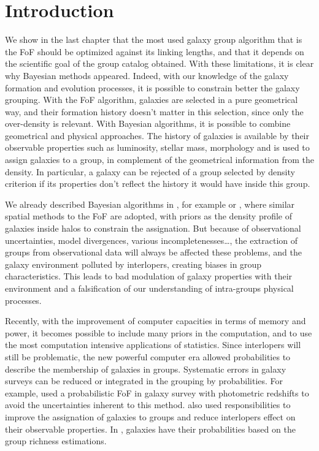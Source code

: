 \section{Introduction}
\label{sec:maggie_introduction}

\newcommand\rvir{r_{\rm vir}}
\newcommand\vvir{v_{\rm vir}}

We show in the last chapter that the most used galaxy group algorithm that
is the FoF should be optimized against its linking lengths, and that it
depends on the scientific goal of the group catalog obtained. With these
limitations, it is clear why Bayesian methods appeared. Indeed, with our
knowledge of the galaxy formation and evolution processes, it is possible to
constrain better the galaxy grouping. With the FoF algorithm, galaxies are
selected in a pure geometrical way, and their formation history doesn't
matter in this selection, since only the over-density is relevant. With
Bayesian algorithms, it is possible to combine geometrical and physical
approaches. The history of galaxies is available by their observable
properties such as luminosity, stellar mass, morphology and is used to
assign galaxies to a group, in complement of the geometrical information
from the density. In particular, a galaxy can be rejected of a group
selected by density criterion if its properties don't reflect the history it
would have inside this group.

We already described Bayesian algorithms in
, for example \citet{Yang+07} or
\citet{MunozCuartas+12}, where similar spatial methods to the FoF are
adopted, with priors as the density profile of galaxies inside halos to
constrain the assignation. But because of observational uncertainties, model
divergences, various incompletenesses\ldots, the extraction of groups from
observational data will always be affected these problems, and the galaxy
environment polluted by interlopers, creating biases in group
characteristics. This leads to bad modulation of galaxy properties with
their environment and a falsification of our understanding of intra-groups
physical processes.

Recently, with the improvement of computer capacities in terms of memory and
power, it becomes possible to include many priors in the computation, and to
use the most computation intensive applications of statistics. Since
interlopers will still be problematic, the new powerful computer era allowed
probabilities to describe the membership of galaxies in groups. Systematic
errors in galaxy surveys can be reduced or integrated in the grouping by
probabilities. For example, \citet{Liu+08} used a probabilistic FoF in
galaxy survey with photometric redshifts to avoid the uncertainties
inherent to this method. \citet{DominguezRomero+12} also used
responsibilities to improve the assignation of galaxies to groups and
reduce interlopers effect on their observable properties. In
\citet{Rykoff+14}, galaxies have their probabilities based on the group
richness estimations.

